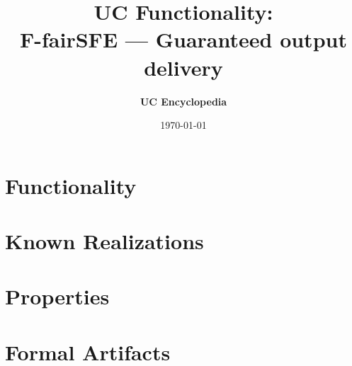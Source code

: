 \documentclass[11pt,a4paper]{article}
\title{\textbf{\Large UC Functionality:}\\[0.2em] \Large F-fairSFE --- Guaranteed output delivery}
\author{\textbf{UC Encyclopedia}}
\date{\today}
\newtheorem{functionality}{Functionality}
\begin{document}
\maketitle

\begin{abstract}
\end{abstract}

\section{Functionality}

%

\section{Known Realizations}


\section{Properties}


\section{Formal Artifacts}

\end{document}
